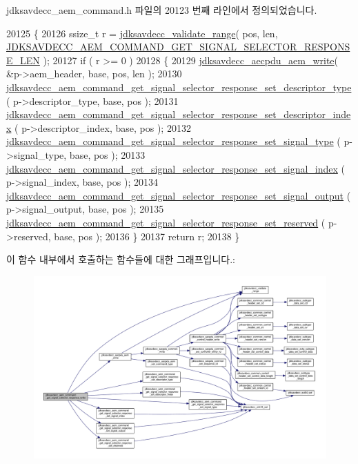 jdksavdecc\+\_\+aem\+\_\+command.\+h 파일의 20123 번째 라인에서 정의되었습니다.


\begin{DoxyCode}
20125 \{
20126     ssize\_t r = \hyperlink{group__util_ga9c02bdfe76c69163647c3196db7a73a1}{jdksavdecc\_validate\_range}( pos, len, 
      \hyperlink{group__command__get__signal__selector__response_ga4a41341e46b170f9678cd06cde61f1c9}{JDKSAVDECC\_AEM\_COMMAND\_GET\_SIGNAL\_SELECTOR\_RESPONSE\_LEN}
       );
20127     \textcolor{keywordflow}{if} ( r >= 0 )
20128     \{
20129         \hyperlink{group__aecpdu__aem_gad658e55771cce77cecf7aae91e1dcbc5}{jdksavdecc\_aecpdu\_aem\_write}( &p->aem\_header, base, pos, len );
20130         \hyperlink{group__command__get__signal__selector__response_ga4887f5621f1139b2aad059d215e32e2f}{jdksavdecc\_aem\_command\_get\_signal\_selector\_response\_set\_descriptor\_type}
      ( p->descriptor\_type, base, pos );
20131         \hyperlink{group__command__get__signal__selector__response_gaa14ad43533e407456eb88104445b275f}{jdksavdecc\_aem\_command\_get\_signal\_selector\_response\_set\_descriptor\_index}
      ( p->descriptor\_index, base, pos );
20132         \hyperlink{group__command__get__signal__selector__response_gac0e03f241a0edfeb9c2584d1b4e328c5}{jdksavdecc\_aem\_command\_get\_signal\_selector\_response\_set\_signal\_type}
      ( p->signal\_type, base, pos );
20133         \hyperlink{group__command__get__signal__selector__response_gaf78c64111e68d05a32ec9e543ce9ec71}{jdksavdecc\_aem\_command\_get\_signal\_selector\_response\_set\_signal\_index}
      ( p->signal\_index, base, pos );
20134         \hyperlink{group__command__get__signal__selector__response_gaaa138d32719cc3c765c5ccdcdba9b039}{jdksavdecc\_aem\_command\_get\_signal\_selector\_response\_set\_signal\_output}
      ( p->signal\_output, base, pos );
20135         \hyperlink{group__command__get__signal__selector__response_ga16bbf070b071807dd79bd77cf779f85c}{jdksavdecc\_aem\_command\_get\_signal\_selector\_response\_set\_reserved}
      ( p->reserved, base, pos );
20136     \}
20137     \textcolor{keywordflow}{return} r;
20138 \}
\end{DoxyCode}


이 함수 내부에서 호출하는 함수들에 대한 그래프입니다.\+:
\nopagebreak
\begin{figure}[H]
\begin{center}
\leavevmode
\includegraphics[width=350pt]{group__command__get__signal__selector__response_gace617c7d68ef5af63100e47c6661c1c6_cgraph}
\end{center}
\end{figure}



